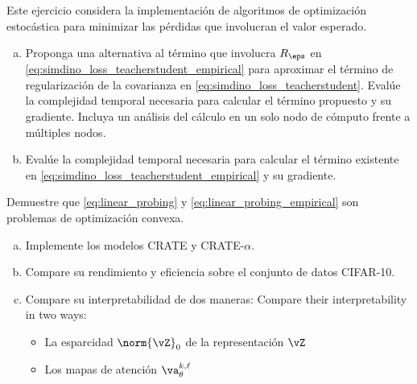 \documentclass[../../book-main_es.tex]{subfiles}
\begin{document}
\begin{exercise}
Este ejercicio considera la implementación de algoritmos de optimización estocástica
para minimizar las pérdidas que involucran el valor esperado.
\begin{enumerate}[(a)]
\item Proponga una alternativa al término que involucra \(R_{\eps}\) en
    \eqref{eq:simdino_loss_teacherstudent_empirical} para
    aproximar el término de regularización de la covarianza en
    \eqref{eq:simdino_loss_teacherstudent}. Evalúe la complejidad temporal
    necesaria para calcular el término propuesto y su
    gradiente. Incluya un análisis del cálculo en un solo
    nodo de cómputo frente a múltiples nodos.
\item Evalúe la complejidad temporal necesaria para calcular el término existente
    en \eqref{eq:simdino_loss_teacherstudent_empirical} y su gradiente.
\end{enumerate}
\end{exercise}

\begin{exercise}
Demuestre que \eqref{eq:linear_probing} y
\eqref{eq:linear_probing_empirical} son problemas de optimización convexa.
\end{exercise}

\begin{exercise}
\phantom{}
\begin{enumerate}[(a)]
\item Implemente los modelos CRATE y CRATE-\(\alpha\).
\item Compare su rendimiento y eficiencia sobre el conjunto de datos CIFAR-10.
\item Compare su interpretabilidad de dos maneras:
Compare their interpretability in two ways:
    \begin{itemize}
        \item La esparcidad \(\norm{\vZ}_{0}\) de la representación \(\vZ\)
        \item Los mapas de atención \(\va_{\theta}^{k, \ell}\)
    \end{itemize}
\end{enumerate}
\end{exercise}
\end{document}
